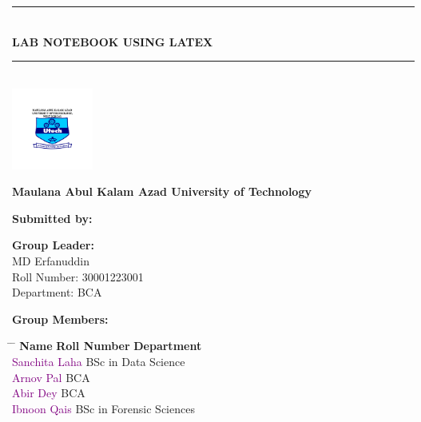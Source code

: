 \documentclass[12pt,a4paper]{article}
\begin{document}
	\begin{titlepage}
		\centering
		\vspace*{1cm}
		
		\noindent\rule{\textwidth}{1pt}\\[0.3cm]
		
		{\Huge\textbf{\color{blue}LAB NOTEBOOK USING LATEX}}\\
		\vspace{0.5cm}
		\noindent\rule{\textwidth}{1pt}\\[1.5cm]
		
		\includegraphics[width=0.2\textwidth]{makaut.png} %
		\vspace{0.8cm}
		
		\Large\textbf{\color{blue}Maulana Abul Kalam Azad University of Technology}\\
		\vspace{0.8cm}
		
		\Large\textbf{Submitted by:}\\
		\vspace{0.3cm}
		
		\textbf{\color{red}Group Leader:}\\
		\vspace{0.2cm}
		\Large MD Erfanuddin\\
		\large Roll Number: 30001223001\\
		Department: BCA\\
		
		\vspace{1cm}
		
		\textbf{\color{green}Group Members:}\\
		\vspace{0.3cm}
		
		\large
		\begin{tabbing}
			\hspace{4cm} \= \hspace{8cm} \= \kill
			\textbf{Name} \> \textbf{Roll Number} \> \textbf{Department} \\
			\textcolor{purple}{Sanchita Laha}  \> BSc in Data Science \\
			\textcolor{purple}{Arnov Pal}  \> BCA \\
			\textcolor{purple}{Abir Dey}  \> BCA \\
			\textcolor{purple}{Ibnoon Qais}  \> BSc in Forensic Sciences \\
		\end{tabbing}
		

\end{titlepage}
\end{document}
